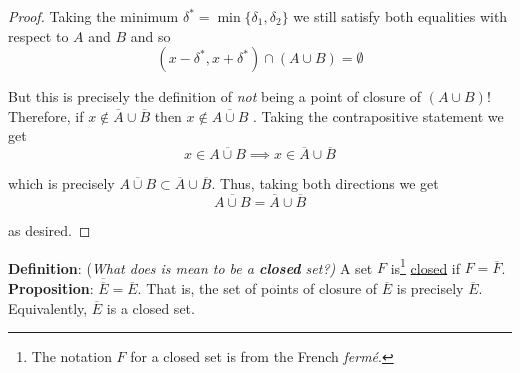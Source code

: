 \documentclass[12pt]{article}
\newlength\tindent
\renewcommand{\indent}{\hspace*{\tindent}}
\begin{document}
\begin{enumerate}[(a)]
\begin{proof}
	\indent Taking the minimum $\delta^* = \min\{\delta_1, \delta_2\}$ we still satisfy both equalities with respect to $A$ and $B$ and so
	\begin{equation*}
		(x - \delta^*, x + \delta^*) \cap (A \cup B) = \emptyset
	\end{equation*}
	
	\indent But this is precisely the definition of {\em not} being a point of closure of $(A \cup B)$! Therefore, if $x \notin \overline{A} \cup \overline{B}$ then $x \notin \overline{A \cup B}$	. Taking the contrapositive statement we get
	\begin{equation*}
		x \in \overline{A\cup B} \implies x \in \overline{A} \cup \overline{B}
	\end{equation*}
	
	which is precisely $\overline{A\cup B} \subset \overline{A} \cup \overline{B}$. Thus, taking both directions we get
	\begin{equation*}
		\overline{A\cup B} = \overline{A} \cup \overline{B}
	\end{equation*}
	
	as desired.
	\end{proof}
\end{enumerate}

%
% 
{\bf Definition}: {(\em What does is mean to be a {\bf \em closed} set?)} A set $F$ is\footnote{The notation $F$ for a closed set is from the French {\em ferm\'{e}}.} \underline{closed} if $F = \overline{F}$. \\

%
%
{\bf Proposition}: $\overline{\overline{E}} = \overline{E}$. That is, the set of points of closure of $\overline{E}$ is precisely $\overline{E}$. Equivalently, $\overline{E}$ is a closed set.
\end{document}
